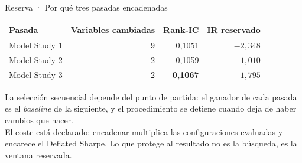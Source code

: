 \documentclass[aspectratio=169,11pt]{beamer}
\begin{document}
{\begin{frame}{Reserva · Por qué tres pasadas encadenadas}
  \vspace{0.25cm}
  \small
  \begin{center}
  \begin{tabular}{lrrr}
    \toprule
    Pasada & Variables cambiadas & Rank-IC & IR reservado \\
    \midrule
    Model Study 1 & 9 & 0,1051 & $-2{,}348$ \\
    Model Study 2 & 2 & 0,1059 & $-1{,}010$ \\
    Model Study 3 & 2 & \textbf{0,1067} & $-1{,}795$ \\
    \bottomrule
  \end{tabular}
  \end{center}
  \vspace{0.45cm}
  {\small La selección secuencial depende del punto de partida: el ganador de cada pasada es el
  \textit{baseline} de la siguiente, y el procedimiento se detiene cuando deja de haber cambios que
  hacer.\\[0.25cm]
  El coste está declarado: encadenar multiplica las configuraciones evaluadas y encarece el Deflated
  Sharpe. Lo que protege al resultado no es la búsqueda, es la ventana reservada.}
\end{frame}}
\end{document}
